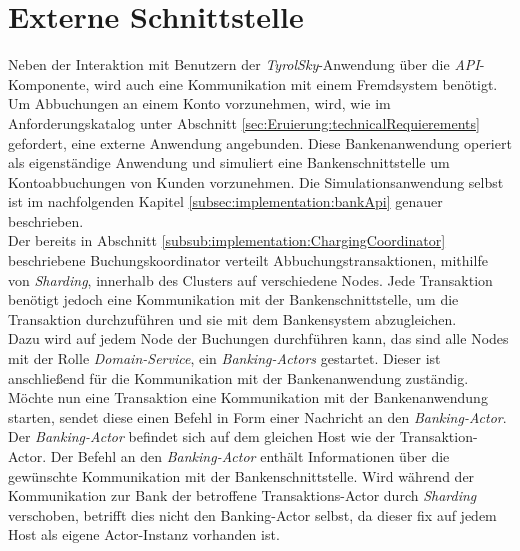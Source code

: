 \section{Externe Schnittstelle}
\label{sec:implementation:externalApi}
Neben der Interaktion mit Benutzern der \textit{TyrolSky}-Anwendung über die \textit{API}-Komponente, wird auch eine Kommunikation mit einem Fremdsystem benötigt. Um Abbuchungen an einem Konto vorzunehmen, wird, wie im Anforderungskatalog unter Abschnitt \ref{sec:Eruierung:technicalRequierements} gefordert, eine externe Anwendung angebunden. Diese Bankenanwendung operiert als eigenständige Anwendung und simuliert eine Bankenschnittstelle um Kontoabbuchungen von Kunden vorzunehmen. Die Simulationsanwendung selbst ist im nachfolgenden Kapitel \ref{subsec:implementation:bankApi} genauer beschrieben. \\
Der bereits in Abschnitt \ref{subsub:implementation:ChargingCoordinator} beschriebene Buchungskoordinator verteilt Abbuchungstransaktionen, mithilfe von \textit{Sharding}, innerhalb des Clusters auf verschiedene Nodes. Jede Transaktion benötigt jedoch eine Kommunikation mit der Bankenschnittstelle, um die Transaktion durchzuführen und sie mit dem Bankensystem abzugleichen. \\
Dazu wird auf jedem Node der Buchungen durchführen kann, das sind alle Nodes mit der Rolle \textit{Domain-Service}, ein \textit{Banking-Actors} gestartet. Dieser ist anschließend für die Kommunikation mit der Bankenanwendung zuständig. \\
Möchte nun eine Transaktion eine Kommunikation mit der Bankenanwendung starten, sendet diese einen Befehl in Form einer Nachricht an den \textit{Banking-Actor}. Der \textit{Banking-Actor} befindet sich auf dem gleichen Host wie der Transaktion-Actor. Der Befehl an den \textit{Banking-Actor} enthält Informationen über die gewünschte Kommunikation mit der Bankenschnittstelle. Wird während der Kommunikation zur Bank der betroffene Transaktions-Actor durch \textit{Sharding} verschoben, betrifft dies nicht den Banking-Actor selbst, da dieser fix auf jedem Host als eigene Actor-Instanz vorhanden ist. 
